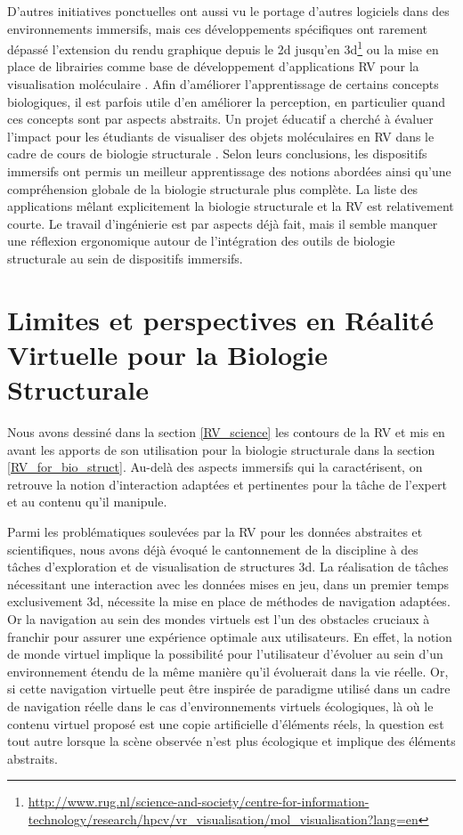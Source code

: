 D'autres initiatives ponctuelles ont aussi vu le portage d'autres logiciels dans des environnements immersifs, mais ces développements spécifiques ont rarement dépassé l'extension du rendu graphique depuis le 2d jusqu'en 3d\footnote{\url{http://www.rug.nl/science-and-society/centre-for-information-technology/research/hpcv/vr\_visualisation/mol\_visualisation?lang=en}} ou la mise en place de librairies comme base de développement d'applications RV pour la visualisation moléculaire \cite{salvadori_moka:_2014}.  Afin d'améliorer l'apprentissage de certains concepts biologiques, il est parfois utile d'en améliorer la perception, en particulier quand ces concepts sont par aspects abstraits. Un projet éducatif a cherché à évaluer l'impact pour les étudiants de visualiser des objets moléculaires en RV dans le cadre de cours de biologie structurale \cite{tan_use_2013}. Selon leurs conclusions, les dispositifs immersifs ont permis un meilleur apprentissage des notions abordées ainsi qu'une compréhension globale de la biologie structurale plus complète.
La liste des applications mêlant explicitement la biologie structurale et la RV est relativement courte. Le travail d'ingénierie est par aspects déjà fait, mais il semble manquer une réflexion ergonomique autour de l'intégration des outils de biologie structurale au sein de dispositifs immersifs.


\section{Limites et perspectives en Réalité Virtuelle pour la Biologie Structurale} %
\label{sec:RV_perspectives}

Nous avons dessiné dans la section \ref{RV_science} les contours de la RV et mis en avant les apports de son utilisation pour la biologie structurale dans la section \ref{RV_for_bio_struct}. Au-delà des aspects immersifs qui la caractérisent, on retrouve la notion d'interaction adaptées et pertinentes pour la tâche de l'expert et au contenu qu'il manipule.

Parmi les problématiques soulevées par la RV pour les données abstraites et scientifiques, nous avons déjà évoqué le cantonnement de la discipline à des tâches d'exploration et de visualisation de structures 3d. La réalisation de tâches nécessitant une interaction avec les données mises en jeu, dans un premier temps exclusivement 3d, nécessite la mise en place de méthodes de navigation adaptées. Or la navigation au sein des mondes virtuels est l'un des obstacles cruciaux à franchir pour assurer une expérience optimale aux utilisateurs. En effet, la notion de monde virtuel implique la possibilité pour l'utilisateur d'évoluer au sein d'un environnement étendu de la même manière qu'il évoluerait dans la vie réelle. Or, si cette navigation virtuelle peut être inspirée de paradigme utilisé dans un cadre de navigation réelle dans le cas d'environnements virtuels écologiques, là où le contenu virtuel proposé est une copie artificielle d'éléments réels, la question est tout autre lorsque la scène observée n'est plus écologique et implique des éléments abstraits. 

